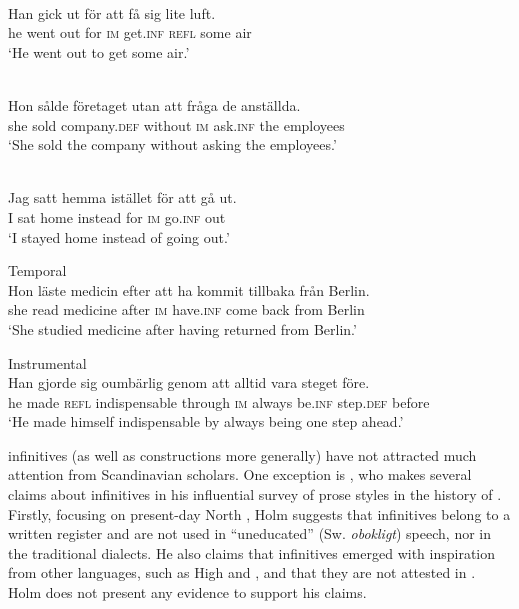 \documentclass[output=paper]{langscibook}
\begin{document}
\ea
\label{ex:kalm:1}
\ea {}\label{ex:kalm:1a}\\
\gll Han gick ut för att få sig lite luft.\\
he went out for \textsc{im} get.\textsc{inf} \textsc{refl} some air\\
\glt ‘He went out to get some air.’

\ex {}\label{ex:kalm:1b}\\
\gll Hon sålde företaget utan att fråga de anställda.\\
she sold company.\textsc{def} without \textsc{im} ask.\textsc{inf} the employees\\
\glt ‘She sold the company without asking the employees.’

\ex {}\label{ex:kalm:1c}\\
\gll Jag satt hemma istället för att gå ut.\\
I sat home instead for \textsc{im} go.\textsc{inf} out\\
\glt‘I stayed home instead of going out.’

\ex Temporal\label{ex:kalm:1d}\\
\gll Hon läste medicin efter att ha kommit tillbaka från Berlin.\\
she read medicine after \textsc{im} have.\textsc{inf} come back from Berlin\\
\glt ‘She studied medicine after having returned from Berlin.’

\ex Instrumental\label{ex:kalm:1e}\\
\gll Han gjorde sig oumbärlig genom att alltid vara steget före.\\
he made \textsc{refl} indispensable through \textsc{im} always be.\textsc{inf} step.\textsc{def} before\\
\glt ‘He made himself indispensable by always being one step ahead.’
\z
\z

 infinitives (as well as  constructions more generally) have not attracted much attention from Scandinavian scholars. One exception is \citet{Holm1967}, who makes several claims about  infinitives in his influential survey of prose styles in the history of . Firstly, focusing on present-day North , Holm suggests that  infinitives belong to a written register and are not used in “uneducated” (Sw. \textit{obokligt}) speech, nor in the traditional dialects. He also claims that  infinitives emerged with inspiration from other languages, such as High  and , and that they are not attested in  \citep[27]{Holm1967}. Holm does not present any evidence to support his claims. 
\end{document}
